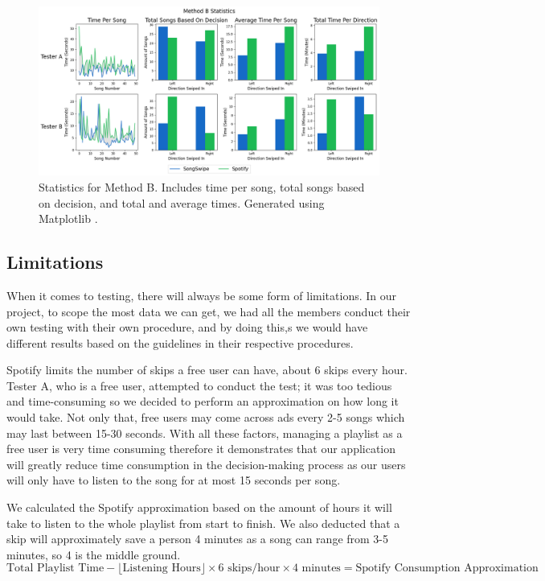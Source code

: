 \documentclass{article}
\begin{document}
\begin{figure}[ht]
    \centering
    \includegraphics[width=6in]{./method_b_statistics.png}
    \caption{Statistics for Method B. Includes time per song, total songs based on decision, and total and average times. Generated using Matplotlib \cite{Matplot}.}
    \label{fig:methodbstats}
  \end{figure}

\subsection{Limitations}
When it comes to testing, there will always be some form of limitations. In our project, to scope the most data we can get, we had all the members conduct their own testing with their own procedure, and by doing this,s we would have different results based on the guidelines in their respective procedures.

Spotify limits the number of skips a free user can have, about 6 skips every hour. Tester A, who is a free user, attempted to conduct the test; it was too tedious and time-consuming so we decided to perform an approximation on how long it would take. Not only that, free users may come across ads every 2-5 songs which may last between 15-30 seconds. With all these factors, managing a playlist as a free user is very time consuming therefore it demonstrates that our application will greatly reduce time consumption in the decision-making process as our users will only have to listen to the song for at most 15 seconds per song.
    
\begin{center}
    We calculated the Spotify approximation based on the amount of hours it will take to listen to the whole playlist from start to finish. We also deducted that a skip will approximately save a person 4 minutes as a song can range from 3-5 minutes, so 4 is the middle ground. \newline 
\begin{equation}
\text{Total Playlist Time} - \lfloor\text{Listening Hours}\rfloor \times 6\text{ skips/hour} \times 4\text{ minutes} = \text{Spotify Consumption Approximation}
\end{equation}
\end{center}
\end{document}
